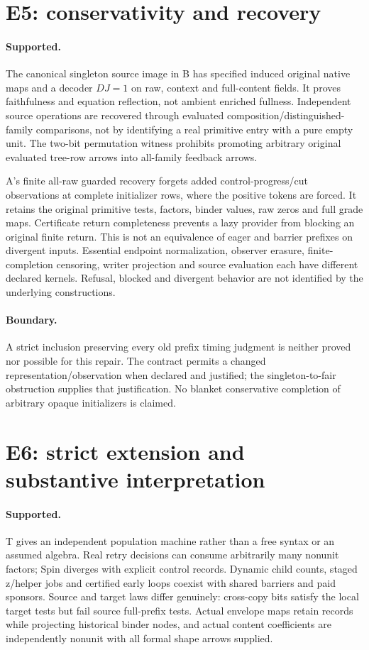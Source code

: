 \documentclass[11pt]{article}
\begin{document}
\section{E5: conservativity and recovery}
\paragraph{Supported.} The canonical singleton source image in B has specified induced original native maps and a decoder $DJ=1$ on raw, context and full-content fields. It proves faithfulness and equation reflection, not ambient enriched fullness. Independent source operations are recovered through evaluated composition/distinguished-family comparisons, not by identifying a real primitive entry with a pure empty unit. The two-bit permutation witness prohibits promoting arbitrary original evaluated tree-row arrows into all-family feedback arrows.

A's finite all-raw guarded recovery forgets added control-progress/cut observations at complete initializer rows, where the positive tokens are forced. It retains the original primitive tests, factors, binder values, raw zeros and full grade maps. Certificate return completeness prevents a lazy provider from blocking an original finite return. This is not an equivalence of eager and barrier prefixes on divergent inputs. Essential endpoint normalization, observer erasure, finite-completion censoring, writer projection and source evaluation each have different declared kernels. Refusal, blocked and divergent behavior are not identified by the underlying constructions.

\paragraph{Boundary.} A strict inclusion preserving every old prefix timing judgment is neither proved nor possible for this repair. The contract permits a changed representation/observation when declared and justified; the singleton-to-fair obstruction supplies that justification. No blanket conservative completion of arbitrary opaque initializers is claimed.

\section{E6: strict extension and substantive interpretation}
\paragraph{Supported.} T gives an independent population machine rather than a free syntax or an assumed algebra. Real retry decisions can consume arbitrarily many nonunit factors; Spin diverges with explicit control records. Dynamic child counts, staged z/helper jobs and certified early loops coexist with shared barriers and paid sponsors. Source and target laws differ genuinely: cross-copy bits satisfy the local target tests but fail source full-prefix tests. Actual envelope maps retain records while projecting historical binder nodes, and actual content coefficients are independently nonunit with all formal shape arrows supplied.
\end{document}
